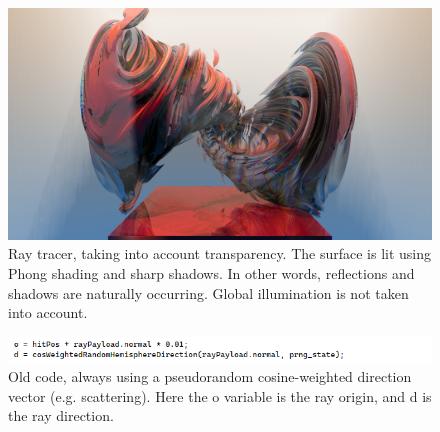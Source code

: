 \documentclass[10pt]{article}
\begin{document}
\begin{figure} 
\centering
  \includegraphics[width = 6 in]{v_rt_reflect.png}
  \caption{ Ray tracer, taking into account transparency.
The surface is lit using Phong shading and sharp shadows.
In other words, reflections and shadows are naturally occurring.
Global illumination is not taken into account.
}
\end{figure}




\begin{figure} 
\centering
  \includegraphics[width = 6 in]{old_code.png}
  \caption{ Old code, always using a pseudorandom cosine-weighted direction vector (e.g. scattering).
Here the o variable is the ray origin, and d is the ray direction.
}
\end{figure}
\end{document}
